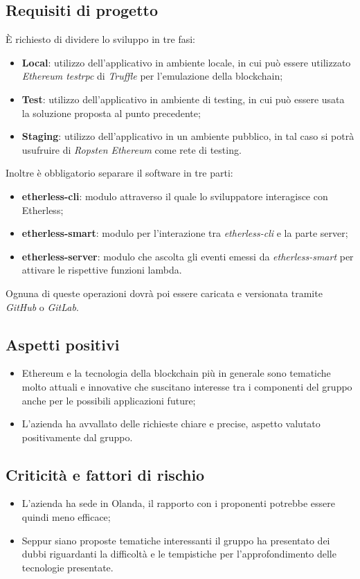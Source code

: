     \subsection{Requisiti di progetto}
        È richiesto di dividere lo sviluppo in tre fasi:
        \begin{itemize}
            \item \textbf{Local}: utilizzo dell'applicativo in ambiente locale, in cui può essere utilizzato \textit{Ethereum testrpc} di \textit{Truffle} per
            l'emulazione della blockchain;
            \item \textbf{Test}: utilizzo dell'applicativo in ambiente di testing, in cui può essere usata la soluzione proposta al punto precedente;
            \item \textbf{Staging}: utilizzo dell'applicativo in un ambiente pubblico, in tal caso si potrà usufruire di \textit{Ropsten Ethereum} come rete di testing.
        \end{itemize}
        Inoltre è obbligatorio separare il software in tre parti:
        \begin{itemize}
            \item \textbf{etherless-cli}: modulo attraverso il quale lo sviluppatore interagisce con Etherless;
            \item \textbf{etherless-smart}: modulo per l'interazione tra \textit{etherless-cli} e la parte server;
            \item \textbf{etherless-server}: modulo che ascolta gli eventi emessi da \textit{etherless-smart} per attivare le rispettive funzioni lambda. 
        \end{itemize}
        Ognuna di queste operazioni dovrà poi essere caricata e versionata tramite \textit{GitHub} o \textit{GitLab}.
    \subsection{Aspetti positivi}
    \begin{itemize}
        \item Ethereum e la tecnologia della blockchain più in generale sono tematiche molto attuali e innovative che suscitano interesse tra i componenti del gruppo
        anche per le possibili applicazioni future;
        \item L'azienda ha avvallato delle richieste chiare e precise, aspetto valutato positivamente dal gruppo.
    \end{itemize}
    \subsection{Criticità e fattori di rischio}
    \begin{itemize}
        \item L'azienda ha sede in Olanda, il rapporto con i proponenti potrebbe essere quindi meno efficace;
        \item Seppur siano proposte tematiche interessanti il gruppo ha presentato dei dubbi riguardanti la difficoltà e le tempistiche per l'approfondimento
        delle tecnologie presentate.
    \end{itemize}
